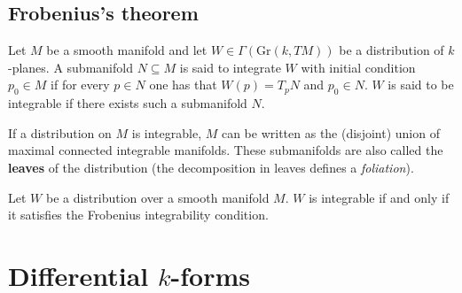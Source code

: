 \subsection{Frobenius's theorem}


    \begin{definition}[Integrable]
        Let $M$ be a smooth manifold and let $W\in\Gamma(\text{Gr}(k, TM))$ be a distribution of $k$-planes. A submanifold $N\subseteq M$ is said to integrate $W$ with initial condition $p_0\in M$ if for every $p\in N$ one has that $W(p) = T_pN$ and $p_0\in N$. $W$ is said to be integrable if there exists such a submanifold $N$.
    \end{definition}
    \begin{property}
        If a distribution on $M$ is integrable, $M$ can be written as the (disjoint) union of maximal connected integrable manifolds. These submanifolds are also called the \textbf{leaves} of the distribution (the decomposition in leaves defines a \textit{foliation}).
    \end{property}

    \begin{theorem}\label{diff:frobenius}
        Let $W$ be a distribution over a smooth manifold $M$. $W$ is integrable if and only if it satisfies the Frobenius integrability condition.
    \end{theorem}

\section{Differential \texorpdfstring{$k$}{k}-forms}\label{section:forms}

